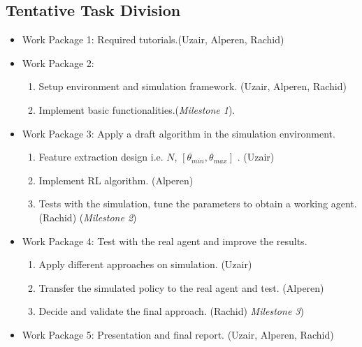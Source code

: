 \documentclass{article}
\begin{document}
\subsection{Tentative Task Division}
\begin{itemize}
\item Work Package 1: Required tutorials.(Uzair, Alperen, Rachid)
\item Work Package 2: 
\begin{enumerate}
\item Setup environment and simulation framework. (Uzair, Alperen, Rachid)
\item Implement basic functionalities.(\textit{Milestone 1}).
\end{enumerate}
\item Work Package 3: Apply a draft algorithm in the simulation environment.
\begin{enumerate}
\item Feature extraction design i.e. $N$, $[\theta_{min}, \theta_{max}]$ . (Uzair)
\item Implement RL algorithm. (Alperen)
\item Tests with the simulation, tune the parameters to obtain a working agent.(Rachid) (\textit{Milestone 2}) 
\end{enumerate}
\item Work Package 4: Test with the real agent and improve the results.
\begin{enumerate}
\item Apply different approaches on simulation. (Uzair)
\item Transfer the simulated policy to the real agent and test. (Alperen)
\item Decide and validate the final approach. (Rachid) \textit{Milestone 3}) 
\end{enumerate}
\item Work Package 5: Presentation and final report. (Uzair, Alperen, Rachid)
\end{itemize}

\medskip


\end{document}
